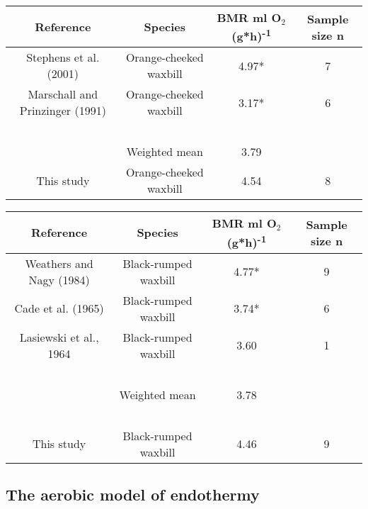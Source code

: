 \documentclass[10pt, twoside]{book} %
\begin{document}
\clearpage

\begin{sidewaystable}[!ht]
    \centering
\caption*{\textbf{Table 1.2}: Comparison of basal metabolic rates (BMR; ml O$_{\text{2}}$ (g*h)\textsuperscript{-1}) between this study and studies on orange-cheeked waxbill and black-rumped waxbill with weighted means. Values with * were converted from rest metabolic rate (RMR) to BMR and standardized to ml O$_{\text{2}}$ (g*h)\textsuperscript{-1}, following Boyce et al. (2020)}
    \begin{tabular}{cccc}

    \hline
\textbf{Reference} & \textbf{Species} & \textbf{BMR ml O$_{\text{2}}$ (g*h)\textsuperscript{-1}} & \textbf{Sample size n} \\
    \hline
        Stephens et al. (2001) & Orange-cheeked waxbill & 4.97* & 7 \\ 
    \hline
        Marschall and Prinzinger (1991) & Orange-cheeked waxbill & 3.17* & 6 \\ 
            \hline
~ & ~ & ~ & ~ \\ 
        ~ & Weighted mean & 3.79 & ~ \\ 
\hline
        This study & Orange-cheeked waxbill & 4.54 & 8 \\
\hline
\end{tabular}

\bigskip
    \begin{tabular}{cccc}
    \hline
\textbf{Reference} & \textbf{Species} & \textbf{BMR ml O$_{\text{2}}$ (g*h)\textsuperscript{-1}} & \textbf{Sample size n} \\
    \hline
        Weathers and Nagy (1984) & Black-rumped waxbill & 4.77* & 9 \\ 
\hline
        Cade et al. (1965) & Black-rumped waxbill & 3.74* & 6 \\ 
\hline
        Lasiewski et al., 1964 & Black-rumped waxbill & 3.60 & 1 \\ 
\hline
        ~ & ~ & ~ & ~ \\ 
        ~ & Weighted mean & 3.78 & ~ \\ 
        ~ & ~ & ~ & ~ \\ 
\hline
        This study & Black-rumped waxbill & 4.46 & 9 \\
\hline
    \end{tabular}
\end{sidewaystable}

\clearpage

\subsection{The aerobic model of endothermy}
\end{document}

